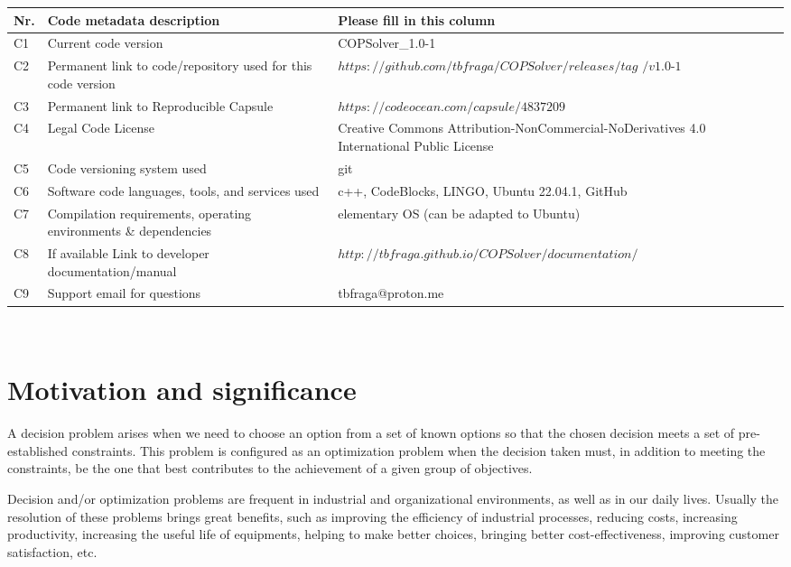 \documentclass[11pt, letterpaper]{article}
\begin{document}
\noindent
\begin{tabular}{|l|p{6.5cm}|p{9.5cm}|}
\hline
\textbf{Nr.} & \textbf{Code metadata description} & \textbf{Please fill in this column} \\
\hline
C1 & Current code version & COPSolver\_1.0-1 \\
\hline
C2 & Permanent link to code/repository used for this code version & $https://github.com/tbfraga/COPSolver/releases/tag$ $/v1.0\textrm{-}1$ \\
\hline
C3  & Permanent link to Reproducible Capsule & $https://codeocean.com/capsule/4837209$\\
\hline
C4 & Legal Code License   & Creative Commons Attribution-NonCommercial-NoDerivatives 4.0 International Public License \\
\hline
C5 & Code versioning system used & git \\
\hline
C6 & Software code languages, tools, and services used & c++, CodeBlocks, LINGO, Ubuntu 22.04.1, GitHub\\
\hline
C7 & Compilation requirements, operating environments \& dependencies & elementary OS (can be adapted to Ubuntu) \\
\hline
C8 & If available Link to developer documentation/manual & \underline{$http://tbfraga.github.io/COPSolver/documentation/$} \\
\hline
C9 & Support email for questions & tbfraga@proton.me\\
\hline
\end{tabular}\\
\vskip0.5cm
\noindent

\section{Motivation and significance}

A decision problem arises when we need to choose an option from a set of known options so that the chosen decision meets a set of pre-established constraints. This problem is configured as an optimization problem when the decision taken must, in addition to meeting the constraints, be the one that best contributes to the achievement of a given group of objectives.

Decision and/or optimization problems are frequent in industrial and organizational environments, as well as in our daily lives. Usually the resolution of these problems brings great benefits, such as improving the efficiency of industrial processes, reducing costs, increasing productivity, increasing the useful life of equipments, helping to make better choices, bringing better cost-effectiveness, improving customer satisfaction, etc.
\end{document}
